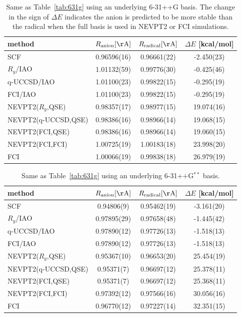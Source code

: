 \documentclass[aps,pra,twocolumn]{revtex4-2}
\begin{document}
\begin{table}[t!]
\begin{tabular}{lccc}
\hline\hline
method & $R_{\mathrm{anion}} [\mathrm{\AA}]$ & $R_{\mathrm{radical}} [\mathrm{\AA}]$ & $\Delta E$ [kcal/mol] \\ \hline
SCF & 0.96596(16) & 0.96661(22) & -2.450(23) \\ \hline
$R_y$/IAO & 1.01132(59) & 0.99776(30) & -0.425(46) \\
q-UCCSD/IAO & 1.01100(23) & 0.99822(15) & -0.295(19) \\
FCI/IAO & 1.01100(23) & 0.99822(15) & -0.295(19) \\ \hline
NEVPT2($R_y$,QSE) & 0.98357(17) & 0.98977(15) & 19.074(16) \\
NEVPT2(q-UCCSD,QSE) & 0.98386(16) & 0.98966(14) & 19.068(15) \\
NEVPT2(FCI,QSE) & 0.98386(16) & 0.98966(14) & 19.060(15) \\
NEVPT2(FCI,FCI) & 1.00725(19) & 1.00183(18) & 23.998(20) \\ \hline
FCI & 1.00066(19) & 0.99838(18) & 26.979(19) \\
\hline\hline
\end{tabular}
\caption{Same as Table~\ref{tab:631g} using an underlying 6-31++G basis. 
The change in the sign of $\Delta E$ indicates the anion is predicted to be more stable than the radical when the full basis is used in NEVPT2 or FCI simulations.}
\label{tab:631ppg}
\end{table}

\begin{table}[t!]
\begin{tabular}{lccc}
\hline\hline
method & $R_{\mathrm{anion}} [\mathrm{\AA}]$ & $R_{\mathrm{radical}} [\mathrm{\AA}]$ & $\Delta E$ [kcal/mol] \\ \hline
SCF & 0.94806(9) & 0.95462(19) & -3.161(20) \\ \hline
$R_y$/IAO & 0.97895(29) & 0.97658(48) & -1.445(42) \\
q-UCCSD/IAO & 0.97890(12) & 0.97726(13) & -1.518(13) \\
FCI/IAO & 0.97890(12) & 0.97726(13) & -1.518(13) \\ \hline
NEVPT2($R_y$,QSE) & 0.95367(10) & 0.96653(20) & 25.454(19) \\
NEVPT2(q-UCCSD,QSE) & 0.95371(7) & 0.96697(12) & 25.378(11) \\
NEVPT2(FCI,QSE) & 0.95371(7) & 0.96697(12) & 25.368(11) \\
NEVPT2(FCI,FCI) & 0.97392(12) & 0.97566(16) & 30.056(16) \\ \hline
FCI & 0.96770(12) & 0.97227(14) & 32.351(15) \\
\hline\hline
\end{tabular}
\caption{Same as Table~\ref{tab:631g} using an underlying 6-31++G${}^{**}$ basis.}
\label{tab:631ppgss}
\end{table}
\end{document}
